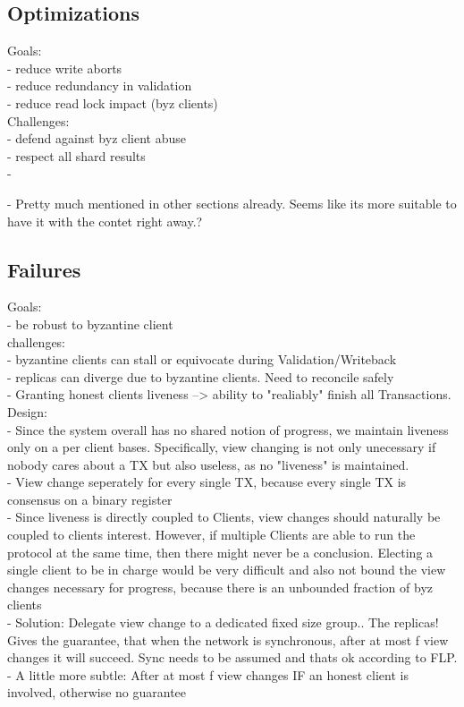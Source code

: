 \subsection{Optimizations}
Goals:\\
- reduce write aborts\\
- reduce redundancy in validation\\
- reduce read lock impact (byz clients)\\

Challenges:\\
- defend against byz client abuse\\
- respect all shard results\\
- 

- Pretty much mentioned in other sections already. Seems like its more suitable to have it with the contet right away.?

\subsection{Failures}
Goals:\\
- be robust to byzantine client\\


challenges:\\
- byzantine clients can stall or equivocate during Validation/Writeback\\
- replicas can diverge due to byzantine clients. Need to reconcile safely\\
- Granting honest clients liveness --> ability to "realiably" finish all Transactions.\\


Design: \\
- Since the system overall has no shared notion of progress, we maintain liveness only on a per client bases. Specifically, view changing is not only unecessary if nobody cares about a TX but also useless, as no "liveness" is maintained.\\
- View change seperately for every single TX, because every single TX is consensus on a binary register\\
- Since liveness is directly coupled to Clients, view changes should naturally be coupled to clients interest. However, if multiple Clients are able to run the protocol at the same time, then there might never be a conclusion. Electing a single client to be in charge would be very difficult and also not bound the view changes necessary for progress, because there is an unbounded fraction of byz clients\\
- Solution: Delegate view change to a dedicated fixed size group.. The replicas! Gives the guarantee, that when the network is synchronous, after at most f view changes it will succeed. Sync needs to be assumed and thats ok according to FLP.\\
- A little more subtle: After at most f view changes IF an honest client is involved, otherwise no guarantee\\

